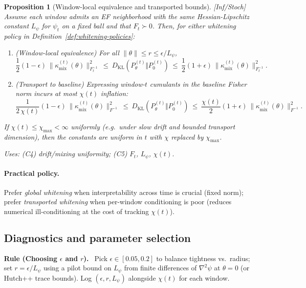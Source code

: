 \documentclass[10pt]{article}
\newenvironment{rulex}[1]{%
\begin{rulebox}\noindent\textbf{Rule (#1).}\ }{\end{rulebox}}
\newcommand{\uses}[1]{\par\smallskip\noindent\textit{Uses: }#1\par\smallskip}
\newtheorem{proposition}{Proposition}
\begin{document}
\begin{proposition}[Window-local equivalence and transported bounds]\label{prop:window-transport}
\emph{[\textup{Inf/Stoch}]} Assume each window admits an EF neighborhood with the \emph{same} Hessian-Lipschitz constant $L_\psi$ for $\psi_t$ on a fixed ball and that $F_t\succ 0$. Then, for either whitening policy in Definition~\ref{def:whitening-policies}:
\begin{enumerate}[leftmargin=*]
\item (\emph{Window-local equivalence}) For all $\|\theta\|\le r\le \epsilon/L_\psi$,
\[
\frac12(1-\epsilon)\,\|\kappa_{\mathrm{mix}}^{(t)}(\theta)\|_{F_t^{-1}}^{2}
\ \le\ D_{\mathrm{KL}}(P_{\theta}^{(t)}\Vert P_{0}^{(t)})\
\le\ \frac12(1+\epsilon)\,\|\kappa_{\mathrm{mix}}^{(t)}(\theta)\|_{F_t^{-1}}^{2}.
\]
\item (\emph{Transport to baseline}) Expressing window-$t$ cumulants in the baseline Fisher norm incurs at most $\chi(t)$ inflation:
\[
\frac1{2\,\chi(t)}(1-\epsilon)\,\|\kappa_{\mathrm{mix}}^{(t)}(\theta)\|_{F^{-1}}^{2}
\ \le\ D_{\mathrm{KL}}(P_{\theta}^{(t)}\Vert P_{0}^{(t)})\
\le\ \frac{\chi(t)}{2}(1+\epsilon)\,\|\kappa_{\mathrm{mix}}^{(t)}(\theta)\|_{F^{-1}}^{2}.
\]
\end{enumerate}
If $\chi(t)\le \chi_{\max}<\infty$ uniformly (e.g.\ under slow drift and bounded transport dimension), then the constants are uniform in $t$ with $\chi$ replaced by $\chi_{\max}$.
\uses{(C4) drift/mixing uniformity; (C5) $F_t$, $L_\psi$, $\chi(t)$.}
\end{proposition}

\paragraph{Practical policy.}
Prefer \emph{global whitening} when interpretability across time is crucial (fixed norm); prefer \emph{transported whitening} when per-window conditioning is poor (reduces numerical ill-conditioning at the cost of tracking $\chi(t)$).

\subsection{Diagnostics and parameter selection}

\begin{rulex}{Choosing \(\epsilon\) and \(r\)}
Pick $\epsilon\in[0.05,0.2]$ to balance tightness vs.\ radius; set $r=\epsilon/L_\psi$ using a pilot bound on $L_\psi$ from finite differences of $\nabla^2\psi$ at $\theta=0$ (or Hutch++ trace bounds). Log $(\epsilon,r,L_\psi)$ alongside $\chi(t)$ for each window.
\end{rulex}
\end{document}
